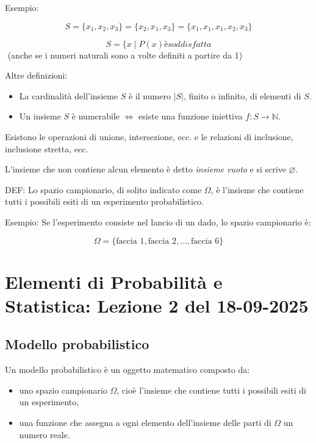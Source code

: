 \documentclass[12pt,a4paper, openany]{book}
\begin{document}
	Esempio:
	
	\[
	S = \{x_1, x_2, x_3\} = \{x_2, x_1, x_3\} = \{x_1, x_1, x_1, x_2, x_3\}
	\]
	
	\[
	S = \{x \mid P(x) è soddisfatta
	\]
	\begin{math}
		[
		\{x \in
		\mathbb{N}
		\mid x \leq 3\} = \{0, 1, 2, 3\}
		4]
	\end{math}
	(anche se i numeri naturali sono a volte definiti a partire da 1)
	
	Altre definizioni:
	\begin{itemize}
		\item La cardinalità dell'insieme $S$ è il numero $|S|$, finito o infinito, di elementi di $S$.
		\item Un insieme $S$ è numerabile $\Leftrightarrow$ esiste una funzione iniettiva $f: S \to \mathbb{N}$.
	\end{itemize}
	
	Esistono le operazioni di unione, intersezione, ecc. e le relazioni di inclusione, inclusione stretta, ecc.
	
	L'insieme che non contiene alcun elemento è detto \emph{insieme vuoto} e si scrive $\varnothing$.
	
	DEF: Lo spazio campionario, di solito indicato come $\Omega$, è l'insieme che contiene tutti i possibili esiti di un esperimento probabilistico.
	
	Esempio: Se l'esperimento consiste nel lancio di un dado, lo spazio campionario è:
	
	\[
	\Omega = \{\text{faccia 1}, \text{faccia 2}, \ldots, \text{faccia 6}\}
	\]
	
	\section{Elementi di Probabilità e Statistica: Lezione 2 del 18-09-2025}
	
	\subsection{Modello probabilistico}
	
	Un modello probabilistico è un oggetto matematico composto da:
	\begin{itemize}
		\item uno spazio campionario $\Omega$, cioè l'insieme che contiene tutti i possibili esiti di un esperimento,
		\item una funzione che assegna a ogni elemento dell'insieme delle parti di $\Omega$ un numero reale.
	\end{itemize}
	
\end{document}
